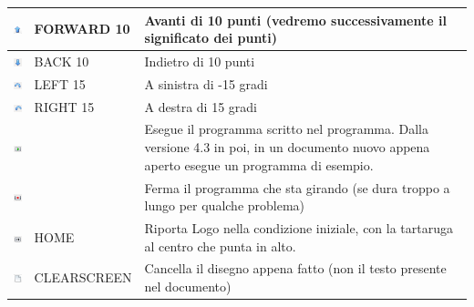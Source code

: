 \begin{center}
  \begin{tabular}{ c | l | p{5cm} }
    \hline
    \includegraphics[width=0.75cm]{./images/librelogo/FrecciaSULO.png} & FORWARD 10 & Avanti di 10 punti (vedremo successivamente il significato dei punti) \\ \hline
    \includegraphics[width=0.75cm]{./images/librelogo/FrecciagiuLO.png} & BACK 10 & Indietro di 10 punti \\ \hline
    \includegraphics[width=0.75cm]{./images/librelogo/Orario.png} & LEFT 15 & A sinistra di -15 gradi \\ \hline
    \includegraphics[width=0.75cm]{./images/librelogo/Antiorario.png} & RIGHT 15 & A destra di 15 gradi \\ \hline
    \includegraphics[width=0.75cm]{./images/librelogo/PlayLO.png} &  & Esegue il programma scritto nel programma. Dalla versione 4.3 in poi, in un documento nuovo appena aperto esegue un programma di esempio. \\ \hline
    \includegraphics[width=0.75cm]{./images/librelogo/StopLO.png} &  & Ferma il programma che sta girando (se dura troppo a lungo per qualche problema) \\ \hline
    \includegraphics[width=0.75cm]{./images/librelogo/RewindLO.png} & HOME & Riporta Logo nella condizione iniziale, con la tartaruga al centro che punta in alto. \\ \hline
    \includegraphics[width=0.75cm]{./images/librelogo/NewpageLO.png} & CLEARSCREEN & Cancella il disegno appena fatto (non il testo presente nel documento) \\ \hline

\end{tabular}
\end{center}
